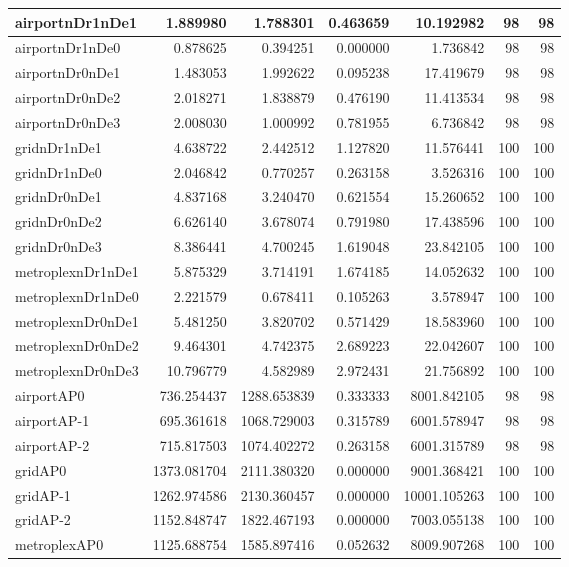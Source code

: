\begin{longtable}{|l|r|r|r|r|r|r|}
\endlastfoot
airportnDr1nDe1 & 1.889980 & 1.788301 & 0.463659 & 10.192982 & 98 & 98 \\ \hline
airportnDr1nDe0 & 0.878625 & 0.394251 & 0.000000 & 1.736842 & 98 & 98 \\ \hline
airportnDr0nDe1 & 1.483053 & 1.992622 & 0.095238 & 17.419679 & 98 & 98 \\ \hline
airportnDr0nDe2 & 2.018271 & 1.838879 & 0.476190 & 11.413534 & 98 & 98 \\ \hline
airportnDr0nDe3 & 2.008030 & 1.000992 & 0.781955 & 6.736842 & 98 & 98 \\ \hline
gridnDr1nDe1 & 4.638722 & 2.442512 & 1.127820 & 11.576441 & 100 & 100 \\ \hline
gridnDr1nDe0 & 2.046842 & 0.770257 & 0.263158 & 3.526316 & 100 & 100 \\ \hline
gridnDr0nDe1 & 4.837168 & 3.240470 & 0.621554 & 15.260652 & 100 & 100 \\ \hline
gridnDr0nDe2 & 6.626140 & 3.678074 & 0.791980 & 17.438596 & 100 & 100 \\ \hline
gridnDr0nDe3 & 8.386441 & 4.700245 & 1.619048 & 23.842105 & 100 & 100 \\ \hline
metroplexnDr1nDe1 & 5.875329 & 3.714191 & 1.674185 & 14.052632 & 100 & 100 \\ \hline
metroplexnDr1nDe0 & 2.221579 & 0.678411 & 0.105263 & 3.578947 & 100 & 100 \\ \hline
metroplexnDr0nDe1 & 5.481250 & 3.820702 & 0.571429 & 18.583960 & 100 & 100 \\ \hline
metroplexnDr0nDe2 & 9.464301 & 4.742375 & 2.689223 & 22.042607 & 100 & 100 \\ \hline
metroplexnDr0nDe3 & 10.796779 & 4.582989 & 2.972431 & 21.756892 & 100 & 100 \\ \hline
airportAP0 & 736.254437 & 1288.653839 & 0.333333 & 8001.842105 & 98 & 98 \\ \hline
airportAP-1 & 695.361618 & 1068.729003 & 0.315789 & 6001.578947 & 98 & 98 \\ \hline
airportAP-2 & 715.817503 & 1074.402272 & 0.263158 & 6001.315789 & 98 & 98 \\ \hline
gridAP0 & 1373.081704 & 2111.380320 & 0.000000 & 9001.368421 & 100 & 100 \\ \hline
gridAP-1 & 1262.974586 & 2130.360457 & 0.000000 & 10001.105263 & 100 & 100 \\ \hline
gridAP-2 & 1152.848747 & 1822.467193 & 0.000000 & 7003.055138 & 100 & 100 \\ \hline
metroplexAP0 & 1125.688754 & 1585.897416 & 0.052632 & 8009.907268 & 100 & 100 \\ \hline

\end{longtable}
